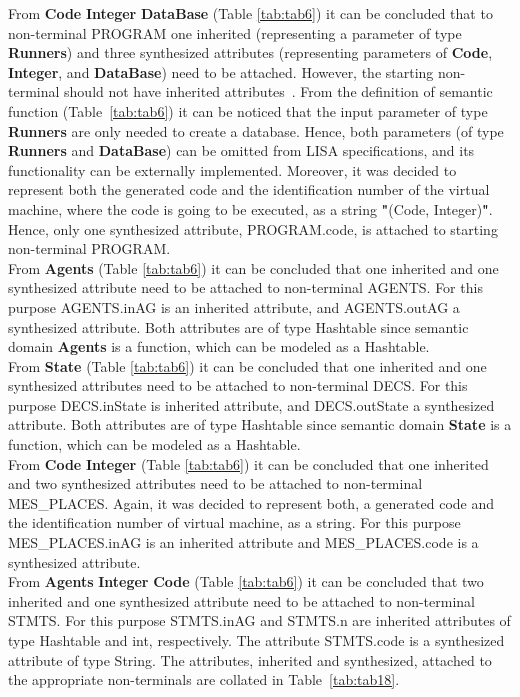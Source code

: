 \documentclass[preprint, prX]{revtex4}
\begin{document}
From  \textbf{Code}  \textbf{Integer}  \textbf{DataBase}  (Table \ref{tab:tab6}) it can be concluded that to non-terminal PROGRAM one inherited (representing a parameter of type \textbf{Runners}) and three synthesized attributes (representing parameters of \textbf{Code}, \textbf{Integer}, and \textbf{DataBase}) need to be attached. However, the starting non-terminal should not have inherited attributes~\cite{Knuth:1968,Paakki:1995}. From the definition of semantic function  (Table~\ref{tab:tab6}) it can be noticed that the input parameter of type \textbf{Runners} are only needed to create a database. Hence, both parameters (of type \textbf{Runners} and \textbf{DataBase}) can be omitted from LISA specifications, and its functionality can be externally implemented. Moreover, it was decided to represent both the generated code and the identification number of the virtual machine, where the code is going to be executed, as a string \textbf{"}(Code, Integer)\textbf{"}. Hence, only one synthesized attribute, PROGRAM.code, is attached to starting non-terminal PROGRAM.\\
From  \textbf{Agents} (Table \ref{tab:tab6}) it can be concluded that one inherited and one synthesized attribute need to be attached to non-terminal AGENTS. For this purpose AGENTS.inAG is an inherited attribute, and AGEN\-TS.outAG a synthesized attribute. Both attributes are of type Hashtable since semantic domain \textbf{Agents} is a function, which can be modeled as a Hashtable.\\
From  \textbf{State} (Table \ref{tab:tab6}) it can be concluded that one inherited and one synthesized attributes need to be attached to non-terminal DECS. For this purpose DECS.inState is inherited attribute, and DECS.outState a synthesized attribute. Both attributes are of type Hashtable since semantic domain \textbf{State} is a function, which can be modeled as a Hashtable.\\
From  \textbf{Code}  \textbf{Integer} (Table \ref{tab:tab6}) it can be concluded that one inherited and two synthesized attributes need to be attached to non-terminal MES\_PLACES. Again, it was decided to represent both, a generated code and the identification number of virtual machine, as a string. For this purpose MES\_\-PLACES.inAG is an inherited attribute and MES\_PLACES.code is a synthesized attribute.\\
From  \textbf{Agents}  \textbf{Integer}  \textbf{Code} (Table \ref{tab:tab6}) it can be concluded that two inherited and one synthesized attribute need to be attached to non-terminal STMTS. For this purpose STMTS.inAG and STMTS.n are inherited attributes of type Hash\-table and int, respectively. The attribute STMTS.code is a synthesized attribute of type String. The attributes, inherited and synthesized, attached to the appropriate non-terminals are collated in Table~\ref{tab:tab18}.
\end{document}
